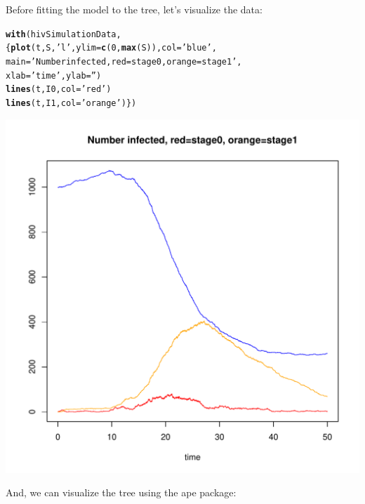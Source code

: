 \documentclass[english]{article}\usepackage[]{graphicx}\usepackage[]{color}
\makeatletter
\def\maxwidth{ %
  \ifdim\Gin@nat@width>\linewidth
    \linewidth
  \else
    \Gin@nat@width
  \fi
}
\newcommand{\hlnum}[1]{\textcolor[rgb]{0.686,0.059,0.569}{#1}}%
\newcommand{\hlstr}[1]{\textcolor[rgb]{0.192,0.494,0.8}{#1}}%
\newcommand{\hlstd}[1]{\textcolor[rgb]{0.345,0.345,0.345}{#1}}%
\newcommand{\hlkwc}[1]{\textcolor[rgb]{0.333,0.667,0.333}{#1}}%
\newcommand{\hlkwd}[1]{\textcolor[rgb]{0.737,0.353,0.396}{\textbf{#1}}}%
\newenvironment{kframe}{%
 \def\at@end@of@kframe{}%
 \ifinner\ifhmode%
  \def\at@end@of@kframe{\end{minipage}}%
  \begin{minipage}{\columnwidth}%
 \fi\fi%
 \def\FrameCommand##1{\hskip\@totalleftmargin \hskip-\fboxsep
 \colorbox{shadecolor}{##1}\hskip-\fboxsep
     \hskip-\linewidth \hskip-\@totalleftmargin \hskip\columnwidth}%
 \MakeFramed {\advance\hsize-\width
   \@totalleftmargin\z@ \linewidth\hsize
   \@setminipage}}%
 {\par\unskip\endMakeFramed%
 \at@end@of@kframe}
\newenvironment{knitrout}{}{} %
\makeatother
\begin{document}
Before fitting the model to the tree, let's visualize the data: 

\begin{knitrout}
\color{fgcolor}\begin{kframe}
\begin{alltt}
\hlkwd{with}\hlstd{(hivSimulationData,}
\hlstd{\{} \hlkwd{plot}\hlstd{(t, S,} \hlstr{'l'}\hlstd{,} \hlkwc{ylim}\hlstd{=}\hlkwd{c}\hlstd{(}\hlnum{0}\hlstd{,} \hlkwd{max}\hlstd{(S)),} \hlkwc{col}\hlstd{=}\hlstr{'blue'}\hlstd{,}
  \hlkwc{main}\hlstd{=}\hlstr{'Number infected, red=stage0, orange=stage1'}\hlstd{,}
  \hlkwc{xlab}\hlstd{=}\hlstr{'time'}\hlstd{,} \hlkwc{ylab}\hlstd{=}\hlstr{''}\hlstd{)}
\hlkwd{lines}\hlstd{(t, I0,} \hlkwc{col}\hlstd{=}\hlstr{'red'}\hlstd{)}
\hlkwd{lines}\hlstd{(t, I1,} \hlkwc{col}\hlstd{=}\hlstr{'orange'}\hlstd{) \})}
\end{alltt}
\end{kframe}
\includegraphics[width=\maxwidth]{figure/unnamed-chunk-4} 

\end{knitrout}


And, we can visualize the tree using the ape package: 
\end{document}
